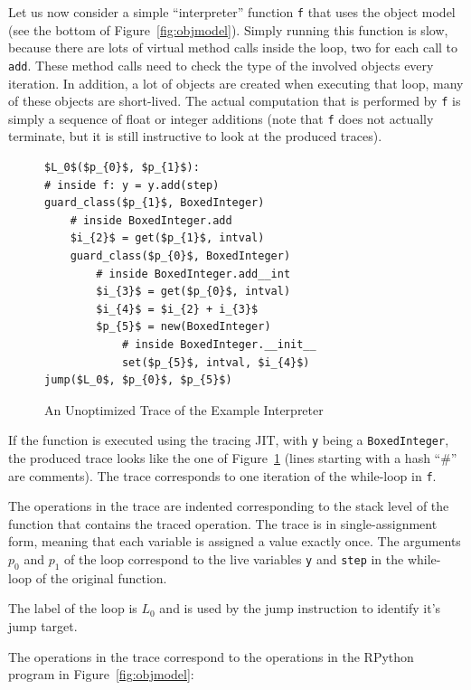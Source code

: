 \documentclass[preprint]{sigplanconf}
\begin{document}
Let us now consider a simple ``interpreter'' function \lstinline{f} that uses the
object model (see the bottom of Figure~\ref{fig:objmodel}).
Simply running this function is slow, because there are lots of virtual method
calls inside the loop, two for each
call to \lstinline{add}. These method calls need to check the type of the involved
objects every iteration. In addition, a lot of objects are created
when executing that loop, many of these objects are short-lived.
The actual computation that is performed by \lstinline{f} is simply a sequence of
float or integer additions (note that \lstinline{f} does not actually terminate,
but it is still instructive to look at the produced traces).


\begin{figure}
\begin{lstlisting}[mathescape,numbers = right,basicstyle=\setstretch{1.05}\ttfamily\scriptsize]
$L_0$($p_{0}$, $p_{1}$):
# inside f: y = y.add(step)
guard_class($p_{1}$, BoxedInteger)
    # inside BoxedInteger.add
    $i_{2}$ = get($p_{1}$, intval)
    guard_class($p_{0}$, BoxedInteger)
        # inside BoxedInteger.add__int
        $i_{3}$ = get($p_{0}$, intval)
        $i_{4}$ = $i_{2} + i_{3}$
        $p_{5}$ = new(BoxedInteger)
            # inside BoxedInteger.__init__
            set($p_{5}$, intval, $i_{4}$)
jump($L_0$, $p_{0}$, $p_{5}$)
\end{lstlisting}
\caption{An Unoptimized Trace of the Example Interpreter}
\label{fig:unopt-trace}
\end{figure}

If the function is executed using the tracing JIT, with \lstinline{y} being a
\lstinline{BoxedInteger}, the produced trace looks like the one of
Figure~\ref{fig:unopt-trace} (lines starting with a hash ``\#'' are comments).
The trace corresponds to one iteration of the while-loop in \lstinline{f}.

The operations in the trace are indented
corresponding to the stack level of the function that contains the traced
operation. The trace is in single-assignment form, meaning that each variable is
assigned a value exactly once. The arguments $p_0$ and $p_1$ of the loop correspond
to the live variables \lstinline{y} and \lstinline{step} in the while-loop of
the original function.

The label of the loop is $L_0$ and is used by the jump instruction to
identify it's jump target.

The operations in the trace correspond to the operations in the RPython program
in Figure~\ref{fig:objmodel}:
\end{document}
